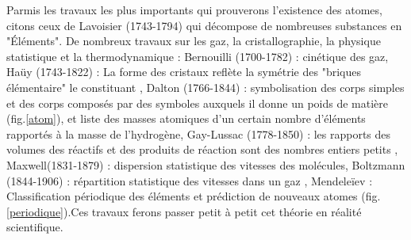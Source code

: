  Parmis les travaux les plus importants qui prouverons l'existence des atomes, citons ceux de Lavoisier (1743-1794) qui décompose de nombreuses substances en "Éléments". De nombreux travaux sur les gaz, la cristallographie, la physique statistique et la thermodynamique : Bernouilli (1700-1782) : cinétique des gaz, Haüy (1743-1822) : La forme des cristaux reflète la symétrie des "briques élémentaire" le constituant , Dalton (1766-1844) : symbolisation des corps simples et des corps composés par des symboles auxquels il donne un poids de matière (fig.\ref{atom}), et liste des masses atomiques d'un certain nombre d'éléments rapportés à la masse de l'hydrogène, Gay-Lussac (1778-1850) : les rapports des volumes des réactifs et des produits de réaction sont des nombres entiers petits , Maxwell(1831-1879) : dispersion statistique des vitesses des molécules, Boltzmann (1844-1906) : répartition statistique des vitesses dans un gaz , Mendeleïev : Classification périodique des éléments et prédiction de nouveaux atomes (fig.\ref{periodique}).Ces travaux ferons passer petit à petit cet théorie en réalité scientifique. 
 
